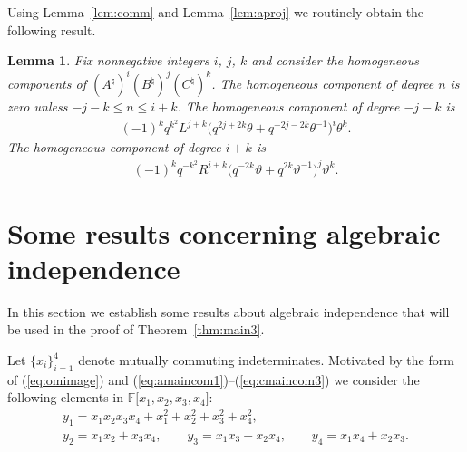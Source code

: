\documentclass[pdftex]{sigma}
\numberwithin{equation}{section}
\newtheorem{Lemma}[Theorem]{Lemma}
\begin{document}
Using Lemma~\ref{lem:comm}
and Lemma~\ref{lem:aproj} we routinely obtain the following result.


\begin{Lemma}
\label{lem:threeproj}
Fix nonnegative integers $i$, $j$, $k$
and consider the homogeneous components of
$(A^\natural)^i(B^\natural)^j(C^\natural)^k$.
The homogeneous component of degree $n$ is zero unless
$-j-k\leq n \leq i+k$.
The homogeneous component of degree $-j-k$ is
\begin{gather*}
(-1)^k q^{k^2}
L^{j+k}
\big(
q^{2j+2k} \theta
+
q^{-2j-2k} \theta^{-1}
\big)^i
\theta^k.
\end{gather*}
The homogeneous component of degree $i+k$ is
\begin{gather*}
(-1)^k q^{-k^2}
R^{i+k}
\big(
q^{-2k}\vartheta +
q^{2k} \vartheta^{-1}
\big)^j
\vartheta^k.
\end{gather*}
\end{Lemma}

\section{Some results concerning algebraic independence}\label{section8}

In this section we establish some results about
algebraic independence that will be used in the proof of
Theorem~\ref{thm:main3}.


Let $\lbrace x_i\rbrace_{i=1}^4$ denote mutually
commuting indeterminates.
Motivated by the form of
(\ref{eq:omimage}) and
(\ref{eq:amaincom1})--(\ref{eq:cmaincom3}) we consider
the following
elements  in
$\mathbb F\lbrack x_1, x_2, x_3, x_4\rbrack$:
\begin{gather}
 y_1 =
x_1x_2x_3x_4
+x_1^2+x_2^2+x_3^2+x_4^2,
\label{eq:y1def}
\\
y_2 = x_1x_2+x_3x_4,
\qquad
y_3 = x_1x_3+x_2x_4,
\qquad
y_4 = x_1x_4+x_2x_3.
\label{eq:y234def}
\end{gather}
\end{document}
